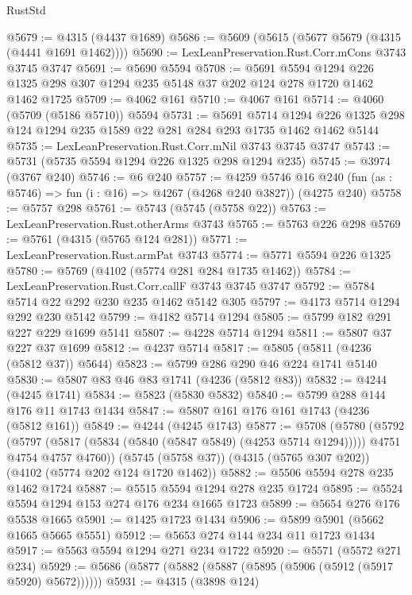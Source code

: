\begin{lexlean}{RustStd}
\begin{coremodule}
@5679 := @4315 (@4437 @1689)
@5686 := @5609 (@5615 (@5677 @5679 (@4315 (@4441 @1691 @1462))))
@5690 := LexLeanPreservation.Rust.Corr.mCons @3743 @3745 @3747
@5691 := @5690 @5594
@5708 := @5691
    @5594
    @1294
    @226
    @1325
    @298
    @307
    @1294
    @235
    @5148
    @37
    @202
    @124
    @278
    @1720
    @1462
    @1462
    @1725
@5709 := @4062 @161
@5710 := @4067 @161
@5714 := @4060 (@5709 (@5186 @5710)) @5594
@5731 := @5691
    @5714
    @1294
    @226
    @1325
    @298
    @124
    @1294
    @235
    @1589
    @22
    @281
    @284
    @293
    @1735
    @1462
    @1462
    @5144
@5735 := LexLeanPreservation.Rust.Corr.mNil @3743 @3745 @3747
@5743 := @5731 (@5735 @5594 @1294 @226 @1325 @298 @1294 @235)
@5745 := @3974 (@3767 @240)
@5746 := @6 @240
@5757 := @4259
    @5746
    @16
    @240
    (fun (as : @5746) => fun (i : @16) => @4267 (@4268 @240 @3827))
    (@4275 @240)
@5758 := @5757 @298
@5761 := @5743 (@5745 (@5758 @22))
@5763 := LexLeanPreservation.Rust.otherArms @3743
@5765 := @5763 @226 @298
@5769 := @5761 (@4315 (@5765 @124 @281))
@5771 := LexLeanPreservation.Rust.armPat @3743
@5774 := @5771 @5594 @226 @1325
@5780 := @5769 (@4102 (@5774 @281 @284 @1735 @1462))
@5784 := LexLeanPreservation.Rust.Corr.callF @3743 @3745 @3747
@5792 := @5784 @5714 @22 @292 @230 @235 @1462 @5142 @305
@5797 := @4173 @5714 @1294 @292 @230 @5142
@5799 := @4182 @5714 @1294
@5805 := @5799 @182 @291 @227 @229 @1699 @5141
@5807 := @4228 @5714 @1294
@5811 := @5807 @37 @227 @37 @1699
@5812 := @4237 @5714
@5817 := @5805 (@5811 (@4236 (@5812 @37)) @5644)
@5823 := @5799 @286 @290 @46 @224 @1741 @5140
@5830 := @5807 @83 @46 @83 @1741 (@4236 (@5812 @83))
@5832 := @4244 (@4245 @1741)
@5834 := @5823 (@5830 @5832)
@5840 := @5799 @288 @144 @176 @11 @1743 @1434
@5847 := @5807 @161 @176 @161 @1743 (@4236 (@5812 @161))
@5849 := @4244 (@4245 @1743)
@5877 := @5708
    (@5780
      (@5792
        (@5797 (@5817 (@5834 (@5840 (@5847 @5849) (@4253 @5714 @1294)))))
        @4751
        @4754
        @4757
        @4760))
    (@5745 (@5758 @37))
    (@4315 (@5765 @307 @202))
    (@4102 (@5774 @202 @124 @1720 @1462))
@5882 := @5506 @5594 @278 @235 @1462 @1724
@5887 := @5515 @5594 @1294 @278 @235 @1724
@5895 := @5524 @5594 @1294 @153 @274 @176 @234 @1665 @1723
@5899 := @5654 @276 @176 @5538 @1665
@5901 := @1425 @1723 @1434
@5906 := @5899 @5901 (@5662 @1665 @5665 @5551)
@5912 := @5653 @274 @144 @234 @11 @1723 @1434
@5917 := @5563 @5594 @1294 @271 @234 @1722
@5920 := @5571 (@5572 @271 @234)
@5929 := @5686 (@5877 (@5882 (@5887 (@5895 (@5906 (@5912 (@5917 @5920) @5672))))))
@5931 := @4315 (@3898 @124)

\end{coremodule}
\end{lexlean}
